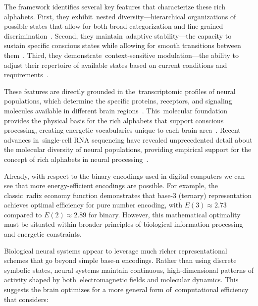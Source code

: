 The framework identifies several key features that characterize these rich alphabets. First, they exhibit~nested diversity—hierarchical organizations of possible states that allow for both broad categorization and fine-grained discrimination~\cite{bakken2021comparative}. Second, they maintain~adaptive stability—the capacity to sustain specific conscious states while allowing for smooth transitions between them~\cite{kelso2012}. Third, they demonstrate~context-sensitive modulation—the ability to adjust their repertoire of available states based on current conditions and requirements~\cite{freeman2007}.

These features are directly grounded in the~transcriptomic profiles of neural populations, which determine the specific proteins, receptors, and signaling molecules available in different brain regions~\cite{siletti2023transcriptomic}. This~molecular foundation provides the physical basis for the rich alphabets that support conscious processing, creating energetic vocabularies unique to each brain area~\cite{cembrowski2018continuous}. Recent advances in~single-cell RNA sequencing have revealed unprecedented detail about the molecular diversity of neural populations, providing empirical support for the concept of rich alphabets in neural processing~\cite{bakken2021comparative}.

Already, with respect to the binary encodings used in digital computers we can see that more energy-efficient encodings are possible. For example, the classic~radix economy function demonstrates that base-3 (ternary) representation achieves optimal efficiency for pure number encoding, with $E(3) \approx 2.73$ compared to $E(2) \approx 2.89$ for binary. However, this mathematical optimality must be situated within broader principles of biological information processing and energetic constraints.

Biological neural systems appear to leverage much richer representational schemes that go beyond simple base-n encodings. Rather than using discrete symbolic states, neural systems maintain continuous, high-dimensional patterns of activity shaped by both~electromagnetic fields and molecular dynamics. This suggests the brain optimizes for a more general form of~computational efficiency that considers:

